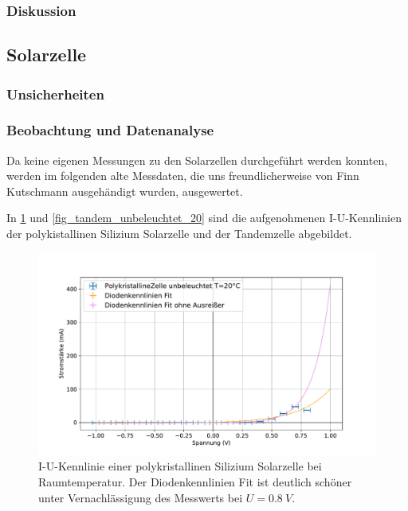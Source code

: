 \documentclass[
	a4paper,
	12pt,
	pagesize,
	ngerman
]{scrartcl}
\begin{document}
	\subsubsection{Diskussion}
	\subsection{Solarzelle}
	\subsubsection{Unsicherheiten}
	\subsubsection{Beobachtung und Datenanalyse}
	Da keine eigenen Messungen zu den Solarzellen durchgeführt werden konnten, werden im folgenden alte Messdaten, die uns freundlicherweise von Finn Kutschmann ausgehändigt wurden, ausgewertet. %

	In \cref{fig_poly_unbeleuchtet_20} und \cref{fig_tandem_unbeleuchtet_20} sind die aufgenohmenen I-U-Kennlinien der polykistallinen Silizium Solarzelle und der Tandemzelle abgebildet.

	\begin{figure}[H]
			\includegraphics[width=.9\linewidth]{img/PolykristallineZelle_unbeleuchtet_20.pdf}
			\caption{
				I-U-Kennlinie einer polykristallinen Silizium Solarzelle bei Raumtemperatur.
				Der Diodenkennlinien Fit ist deutlich schöner unter Vernachlässigung des Messwerts bei $U=\SI{0.8}{V}$. %
								}
			\label{fig_poly_unbeleuchtet_20}
	\end{figure}
\end{document}
